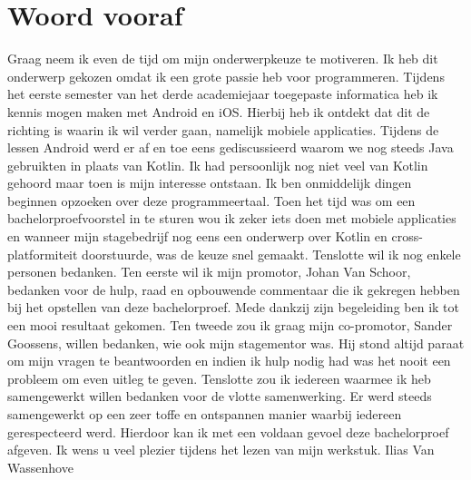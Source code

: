 
\chapter*{Woord vooraf}
\label{ch:voorwoord}

Graag neem ik even de tijd om mijn onderwerpkeuze te motiveren.
\newline
\newline
Ik heb dit onderwerp gekozen omdat ik een grote passie heb voor programmeren. Tijdens het eerste semester van het derde academiejaar toegepaste informatica heb ik kennis mogen maken met Android en iOS. Hierbij heb ik ontdekt dat dit de richting is waarin ik wil verder gaan, namelijk mobiele applicaties. Tijdens de lessen Android werd er af en toe eens gediscussieerd waarom we nog steeds Java gebruikten in plaats van Kotlin. Ik had persoonlijk nog niet veel van Kotlin gehoord maar toen is mijn interesse ontstaan. Ik ben onmiddelijk dingen beginnen opzoeken over deze programmeertaal. Toen het tijd was om een bachelorproefvoorstel in te sturen wou ik zeker iets doen met mobiele applicaties en wanneer mijn stagebedrijf nog eens een onderwerp over Kotlin en cross-platformiteit doorstuurde, was de keuze snel gemaakt.
\newline
\newline
Tenslotte wil ik nog enkele personen bedanken.
\newline
\newline
Ten eerste wil ik mijn promotor, Johan Van Schoor, bedanken voor de hulp, raad en opbouwende commentaar die ik gekregen hebben bij het opstellen van deze bachelorproef. Mede dankzij zijn begeleiding ben ik tot een mooi resultaat gekomen.
\newline
\newline
Ten tweede zou ik graag mijn co-promotor, Sander Goossens, willen bedanken, wie ook mijn stagementor was. Hij stond altijd paraat om mijn vragen te beantwoorden en indien ik hulp nodig had was het nooit een probleem om even uitleg te geven.
\newline
\newline
Tenslotte zou ik iedereen waarmee ik heb samengewerkt willen bedanken voor de vlotte samenwerking. Er werd steeds samengewerkt op een zeer toffe en ontspannen manier waarbij iedereen gerespecteerd werd.
\newline
\newline
Hierdoor kan ik met een voldaan gevoel deze bachelorproef afgeven. Ik wens u veel plezier tijdens het lezen van mijn werkstuk.
\newline
\newline
Ilias Van Wassenhove


